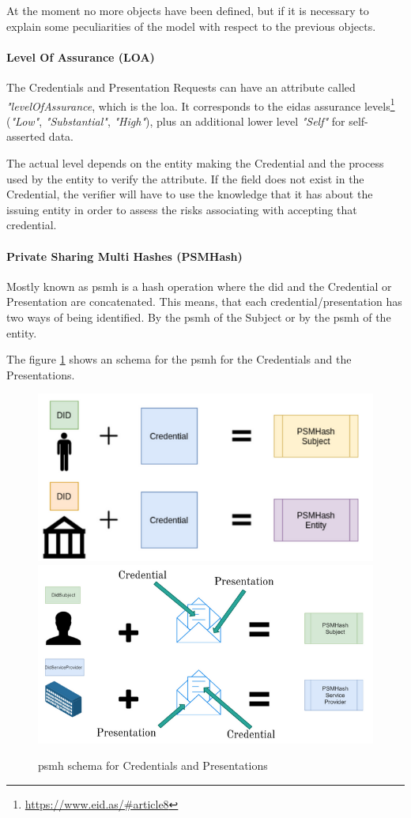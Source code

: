 \documentclass[a4paper, 12pt]{article} %
\begin{document}
            At the moment no more objects have been defined, but if it is necessary to explain some peculiarities of the model with respect to the previous objects.
            
            \paragraph{Level Of Assurance (LOA)}
                The Credentials and Presentation Requests can have an attribute called \textit{"levelOfAssurance}, which is the \acrfull{loa}. It corresponds to the \acrshort{eidas} assurance levels\footnote{\url{https://www.eid.as/\#article8}} (\textit{"Low"}, \textit{"Substantial"}, \textit{"High"}), plus an additional lower level \textit{"Self"} for self-asserted data. 
                
                The actual level depends on the entity making the Credential and the process used by the entity to verify the attribute. If the field does not exist in the Credential, the verifier will have to use the knowledge that it has about the issuing entity in order to assess the risks associating with accepting that credential.
                
            \paragraph{Private Sharing Multi Hashes (PSMHash)}
                Mostly known as \acrshort{psmh} is a hash operation where the \acrshort{did} and the Credential or Presentation are concatenated. This means, that each credential/presentation has two ways of being identified. By the \acrshort{psmh} of the Subject or by the \acrshort{psmh} of the entity.
                
                The figure \ref{fig:psmh} shows an schema for the \acrshort{psmh} for the Credentials and the Presentations.
                \begin{figure}[h]
                    \centering
                    \includegraphics[width=.5\textwidth]{psmhash-credential.png}\hfill
                    \includegraphics[width=.5\textwidth]{psmhash-presentation.png}
                    \caption{\acrshort{psmh} schema for Credentials and Presentations}
                    \label{fig:psmh}
                \end{figure}
                
\end{document}

